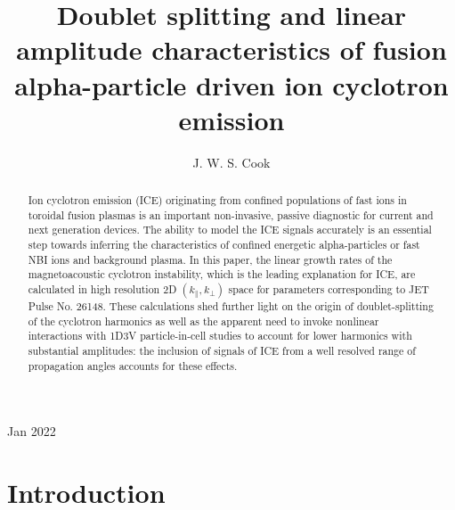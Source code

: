 \documentclass[12pt]{iopart}
\begin{document}
\title[]{Doublet splitting and linear amplitude characteristics of fusion alpha-particle driven ion cyclotron emission}

\author{J. W. S. Cook}

\address{UKAEA-CCFE, Culham Science Centre, Abingdon, OX14 3DB, UK}
\vspace{10pt}
\begin{indented}
\item[]Jan 2022
\end{indented}

\begin{abstract}
Ion cyclotron emission (ICE) originating from confined populations of fast ions in toroidal fusion plasmas is an important non-invasive, passive diagnostic for current and next generation devices. The ability to model the ICE signals accurately is an essential step towards inferring the characteristics of confined energetic alpha-particles or fast NBI ions and background plasma. In this paper, the linear growth rates of the magnetoacoustic cyclotron instability, which is the leading explanation for ICE, are calculated in high resolution 2D $(k_\parallel, k_\perp)$ space for parameters corresponding to JET Pulse No. 26148. These calculations shed further light on the origin of doublet-splitting of the cyclotron harmonics as well as the apparent need to invoke nonlinear interactions with 1D3V particle-in-cell studies to account for lower harmonics with substantial amplitudes: the inclusion of signals of ICE from a well resolved range of propagation angles accounts for these effects.
\end{abstract}

%
%
%
% 
%


\section{Introduction}
\end{document}
